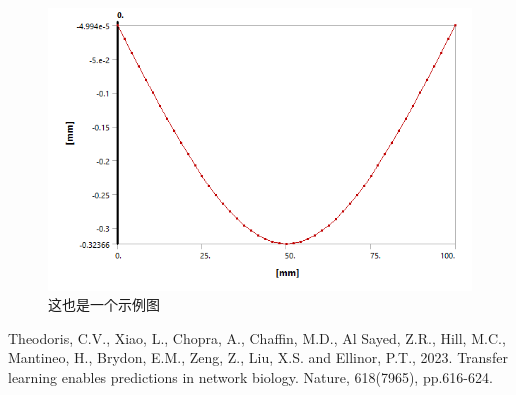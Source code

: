 \documentclass[withoutpreface,bwprint]{cumcmthesis}
\begin{document}
\begin{figure}[!htbp]
    \centering
    \caption{这也是一个示例图}
    \includegraphics[scale=0.5]{Figure/example.png}
\end{figure}


\newpage
\begin{thebibliography}{cite.bib}
    Theodoris, C.V., Xiao, L., Chopra, A., Chaffin, M.D., Al Sayed, Z.R., Hill, M.C., Mantineo, H., Brydon, E.M., Zeng, Z., Liu, X.S. and Ellinor, P.T., 2023. Transfer learning enables predictions in network biology. Nature, 618(7965), pp.616-624.
    

\end{thebibliography}

\end{document}
